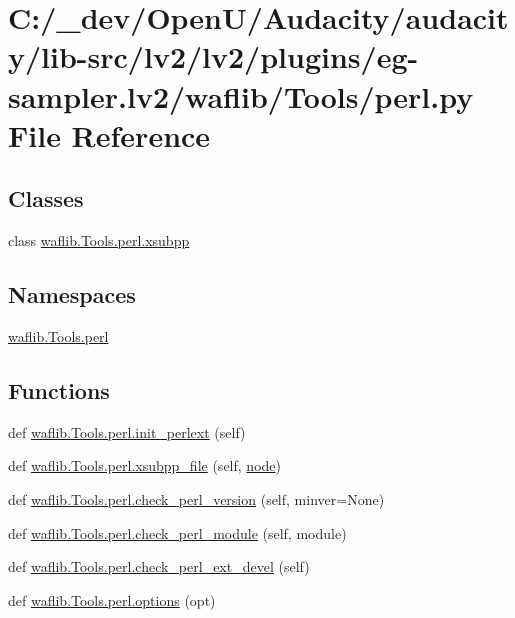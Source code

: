 \hypertarget{lv2_2plugins_2eg-sampler_8lv2_2waflib_2_tools_2perl_8py}{}\section{C\+:/\+\_\+dev/\+Open\+U/\+Audacity/audacity/lib-\/src/lv2/lv2/plugins/eg-\/sampler.lv2/waflib/\+Tools/perl.py File Reference}
\label{lv2_2plugins_2eg-sampler_8lv2_2waflib_2_tools_2perl_8py}
\subsection*{Classes}
\begin{DoxyCompactItemize}
\item 
class \hyperlink{classwaflib_1_1_tools_1_1perl_1_1xsubpp}{waflib.\+Tools.\+perl.\+xsubpp}
\end{DoxyCompactItemize}
\subsection*{Namespaces}
\begin{DoxyCompactItemize}
\item 
 \hyperlink{namespacewaflib_1_1_tools_1_1perl}{waflib.\+Tools.\+perl}
\end{DoxyCompactItemize}
\subsection*{Functions}
\begin{DoxyCompactItemize}
\item 
def \hyperlink{namespacewaflib_1_1_tools_1_1perl_ad690c9b4e0627683b8d8eb680a42daf8}{waflib.\+Tools.\+perl.\+init\+\_\+perlext} (self)
\item 
def \hyperlink{namespacewaflib_1_1_tools_1_1perl_ad98847198592a78a56515c15f095334e}{waflib.\+Tools.\+perl.\+xsubpp\+\_\+file} (self, \hyperlink{structnode}{node})
\item 
def \hyperlink{namespacewaflib_1_1_tools_1_1perl_ac466c27b926b7d70a6643f8d055f62f6}{waflib.\+Tools.\+perl.\+check\+\_\+perl\+\_\+version} (self, minver=None)
\item 
def \hyperlink{namespacewaflib_1_1_tools_1_1perl_a96349a7aa3669ed96474a23459e98246}{waflib.\+Tools.\+perl.\+check\+\_\+perl\+\_\+module} (self, module)
\item 
def \hyperlink{namespacewaflib_1_1_tools_1_1perl_ae2effbe87451eba35dd7aa8cfa8d6b1a}{waflib.\+Tools.\+perl.\+check\+\_\+perl\+\_\+ext\+\_\+devel} (self)
\item 
def \hyperlink{namespacewaflib_1_1_tools_1_1perl_af58a6392e1e27cd335c892a619206093}{waflib.\+Tools.\+perl.\+options} (opt)
\end{DoxyCompactItemize}
